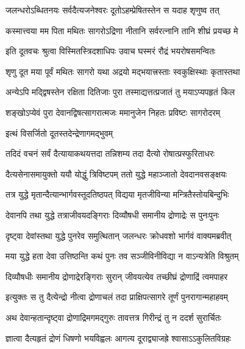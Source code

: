\twolineshloka
{जलन्धरोऽब्धितनयः सर्वदैत्यजनेश्वरः}
{दूतोऽहम्प्रेषितस्तेन स यदाह शृणुष्व तत्} %

\twolineshloka
{कस्मात्त्वया मम पिता मथितः सागरोऽद्रिणा}
{नीतानि सर्वरत्नानि तानि शीघ्रं प्रयच्छ मे} %

\twolineshloka
{इति दूतवचः श्रुत्वा विस्मितस्त्रिदशाधिपः}
{उवाच घस्मरं रौद्रं भयरोषसमन्वितः} %


\twolineshloka
{शृणु दूत मया पूर्वं मथितः सागरो यथा}
{अद्रयो मद्भयात्त्रस्ताः स्वकुक्षिस्थाः कृतास्तथा} %

\twolineshloka
{अन्येऽपि मद्द्विषस्तेन रक्षिता दितिजाः पुरा}
{तस्माद्यत्तत्प्रजातं तु मयाऽप्यपहृतं किल} %

\twolineshloka
{शङ्खोऽप्येवं पुरा देवानद्विषत्सागरात्मजः}
{ममानुजेन निहतः प्रविष्टः सागरोदरम्} %




\onelineshloka
{इत्थं विसर्जितो दूतस्तदेन्द्रेणागमद्भुवम्} %

\twolineshloka
{तदिदं वचनं सर्वं दैत्यायाकथयत्तदा}
{तन्निशम्य तदा दैत्यो रोषात्प्रस्फुरिताधरः} %

\twolineshloka
{दैत्यसेनासमायुक्तो ययौ योद्धुं त्रिविष्टपम्}
{ततो युद्धे महाञ्जातो देवदानवसङ्क्षयः} %

\twolineshloka
{तत्र युद्धे मृतान्दैत्यान्भार्गवस्तूदतिष्ठपत्}
{विद्यया मृतजीविन्या मन्त्रितैस्तोयबिन्दुभिः} %

\twolineshloka
{देवानपि तथा युद्धे तत्राजीवयदङ्गिराः}
{दिव्यौषधी समानीय द्रोणाद्रेः स पुनःपुनः} %

\twolineshloka
{दृष्ट्वा देवांस्तथा युद्धे पुनरेव समुत्थितान्}
{जलन्धरः क्रोधवशो भार्गवं वाक्यमब्रवीत्} %


\twolineshloka
{मया युद्धे हता देवा उत्तिष्ठन्ति कथं पुनः}
{तव सञ्जीविनीविद्या न वाऽन्यत्रेति विश्रुतम्} %


\twolineshloka
{दिव्यौषधीः समानीय द्रोणाद्रेरङ्गिराः सुरान्}
{जीवयत्येव तच्छीघ्रं द्रोणाद्रिं त्वमपाहर} %


\twolineshloka
{इत्युक्तः स तु दैत्येन्द्रो नीत्वा द्रोणाचलं तदा}
{प्राक्षिपत्सागरे तूर्णं पुनरागान्महाहवम्} %

\twolineshloka
{अथ देवान्हतान्दृष्ट्वा द्रोणाद्रिमगमद्गुरुः}
{तावत्तत्र गिरीन्द्रं तु न ददर्श सुरार्चितः} %

\twolineshloka
{ज्ञात्वा दैत्यहृतं द्रोणं धिषणो भयविह्वलः}
{आगत्य दूराद्व्याजह्रे श्वासाऽऽकुलितविग्रहः} %

